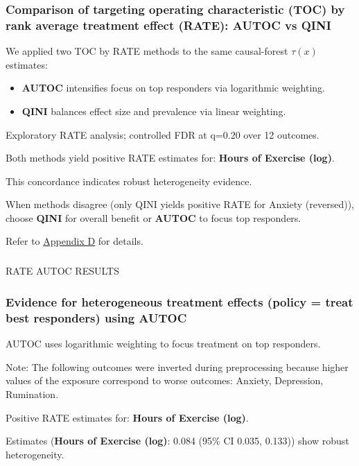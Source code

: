 \documentclass[
  single column]{article}
\makeatletter
\let\oldsubparagraph\subparagraph
\renewcommand{\subparagraph}{
    \@ifstar
      \xxxSubParagraphStar
      \xxxSubParagraphNoStar
  }
\newcommand{\xxxSubParagraphStar}[1]{\oldsubparagraph*{#1}\mbox{}}
\newcommand{\xxxSubParagraphNoStar}[1]{\oldsubparagraph{#1}\mbox{}}
\makeatother
\begin{document}
\subsubsection{Comparison of targeting operating characteristic (TOC) by
rank average treatment effect (RATE): AUTOC vs
QINI}\label{comparison-of-targeting-operating-characteristic-toc-by-rank-average-treatment-effect-rate-autoc-vs-qini}

We applied two TOC by RATE methods to the same causal-forest \(\tau(x)\)
estimates:

\begin{itemize}
\item
  \textbf{AUTOC} intensifies focus on top responders via logarithmic
  weighting.
\item
  \textbf{QINI} balances effect size and prevalence via linear
  weighting.
\end{itemize}

Exploratory RATE analysis; controlled FDR at q=0.20 over 12 outcomes.

Both methods yield positive RATE estimates for: \textbf{Hours of
Exercise (log)}.

This concordance indicates robust heterogeneity evidence.

When methods disagree (only QINI yields positive RATE for Anxiety
(reversed)), choose \textbf{QINI} for overall benefit or \textbf{AUTOC}
to focus top responders.

Refer to \hyperref[appendix-cate-validation]{Appendix D} for details.

\subparagraph{RATE AUTOC RESULTS}\label{rate-autoc-results}

\subsubsection{Evidence for heterogeneous treatment effects (policy =
treat best responders) using
AUTOC}\label{evidence-for-heterogeneous-treatment-effects-policy-treat-best-responders-using-autoc}

AUTOC uses logarithmic weighting to focus treatment on top responders.

Note: The following outcomes were inverted during preprocessing because
higher values of the exposure correspond to worse outcomes: Anxiety,
Depression, Rumination.

Positive RATE estimates for: \textbf{Hours of Exercise (log)}.

Estimates (\textbf{Hours of Exercise (log)}: 0.084 (95\% CI 0.035,
0.133)) show robust heterogeneity.
\end{document}
